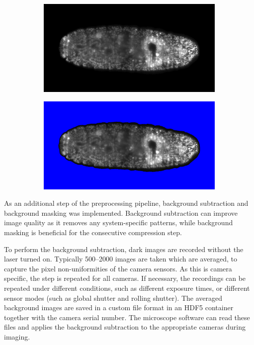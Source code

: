  \begin{figure}
    \centering
    \begin{subfigure}{0.49\textwidth}
      \centering
      \includegraphics[width=\textwidth]{fusion/drosophila_not_masked}
      \caption{}
    \end{subfigure}
    \begin{subfigure}{0.49\textwidth}
      \centering
      \includegraphics[width=\textwidth]{fusion/drosophila_masked}
      \caption{}
    \end{subfigure}
    \label{fig:masking}
  \end{figure}
  
  As an additional step of the preprocessing pipeline, background subtraction and background masking was implemented. Background subtraction can improve image quality as it removes any system-specific patterns, while background masking is beneficial for the consecutive compression step.

  To perform the background subtraction, dark images are recorded without the laser turned on. Typically 500--2000 images are taken which are averaged, to capture the pixel non-uniformities of the camera sensors. As this is camera specific, the step is repeated for all cameras. If necessary, the recordings can be repeated under different conditions, such as different exposure times, or different sensor modes (such as global shutter and rolling shutter). The averaged background images are saved in a custom file format in an HDF5 container \cite{the_hdf_group_hierarchical_1997} together with the camera serial number. The microscope software can read these files and applies the background subtraction to the appropriate cameras during imaging.

